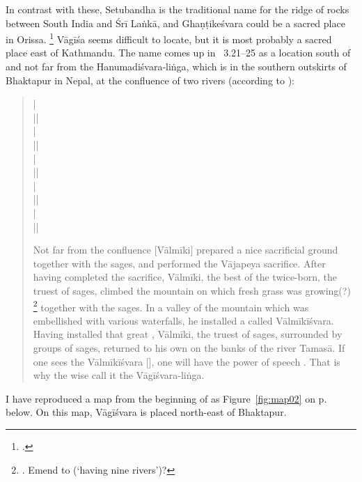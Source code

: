 In contrast with these, Setubandha is the
traditional name for the ridge of rocks between
South India and Śrī Laṅkā, and Ghaṇṭikeśvara could
be a sacred place in Orissa.%
	\footnote{.}
Vāgīśa seems difficult to locate, but it is most probably
a sacred place east of Kathmandu. The name comes
up in \NepMah\ 3.21--25 as a location south of and 
not far from the Hanumadiśvara-liṅga, 
which is in the southern outskirts of 
Bhaktapur in Nepal, at the confluence
of two rivers (according to 
):

\begin{quote}
 |\\
 ||\\
 |\\
 ||\\
 |\\
 ||\\
 |\\
 ||\\
 |\\
 ||

Not far from the confluence [Vālmīki] prepared a nice 
sacrificial ground together with the sages, and 
performed the Vājapeya sacrifice. After having
completed the sacrifice, Vālmīki, the best of
the twice-born, the truest of sages, climbed 
the mountain on which fresh grass was growing(?)%
	\footnote{. Emend to 
	 (`having nine rivers')?}
together with the sages. In a valley of the mountain
which was embellished with various waterfalls, he
installed a  called Vālmīkīśvara. Having 
installed that great , Vālmīki, the truest of
sages, surrounded by groups of sages,
returned to his own  on the banks
of the river Tamasā. If one sees the Vālmīkīśvara [],
one will have the power of speech . 
That is why the wise call it the Vāgīśvara-liṅga.
\end{quote}

\noindent
I have reproduced a map from the beginning of 
 as Figure~\ref{fig:map02}
on p.~\pageref{fig:map02} below. On this map, Vāgīśvara is placed north-east 
of Bhaktapur. 

